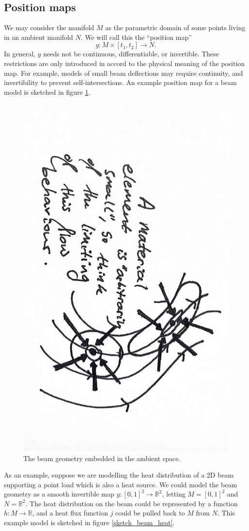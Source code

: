\subsection{Position maps}
We may consider the manifold $M$ as the parametric domain of some points living in an ambient manifold $N$.
We will call this the ``position map''
    $$y:M\times [t_1, t_2] \rightarrow N.$$
In general, $y$ needs not be continuous, differentiable, or invertible.
These restrictions are only introduced in accord to the physical meaning of the position map. For example, models of small beam deflections
may require continuity, and invertibility to prevent self-intersections. An example position map for a beam model is sketched 
in figure \ref{sketch_beam_position_map}.

\begin{figure}[H]
\centerline{\includegraphics[angle=90,page=8,width=0.42\linewidth]{figures/2.pdf}}
\caption{\small The beam geometry embedded in the ambient space.}
\label{sketch_beam_position_map}
\end{figure}
As an example, suppose we are modelling the heat distribution of a 2D beam supporting a point load which is also a heat source.
We could model the beam geometry as a smooth invertible map $y: [0,1]^2\rightarrow \mathbb{R}^2$,
letting $M = [0,1]^2$ and $N = \mathbb{R}^2$. The heat distribution on the beam could be represented
by a function $h : M \rightarrow \mathbb{R}$, and a heat flux function $j$ could be pulled back to $M$ from $N$.
This example model is sketched in figure \ref{sketch_beam_heat}.
